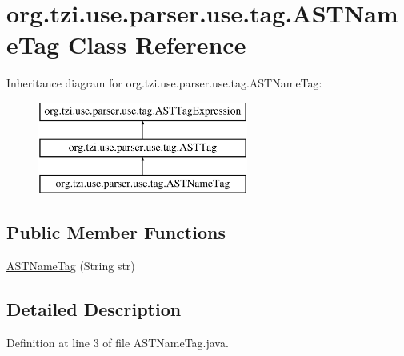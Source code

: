 \hypertarget{classorg_1_1tzi_1_1use_1_1parser_1_1use_1_1tag_1_1_a_s_t_name_tag}{\section{org.\-tzi.\-use.\-parser.\-use.\-tag.\-A\-S\-T\-Name\-Tag Class Reference}
\label{classorg_1_1tzi_1_1use_1_1parser_1_1use_1_1tag_1_1_a_s_t_name_tag}
}
Inheritance diagram for org.\-tzi.\-use.\-parser.\-use.\-tag.\-A\-S\-T\-Name\-Tag\-:\begin{figure}[H]
\begin{center}
\leavevmode
\includegraphics[height=3.000000cm]{classorg_1_1tzi_1_1use_1_1parser_1_1use_1_1tag_1_1_a_s_t_name_tag}
\end{center}
\end{figure}
\subsection*{Public Member Functions}
\begin{DoxyCompactItemize}
\item 
\hyperlink{classorg_1_1tzi_1_1use_1_1parser_1_1use_1_1tag_1_1_a_s_t_name_tag_a696eb0b8f93812794387cb91fdb15544}{A\-S\-T\-Name\-Tag} (String str)
\end{DoxyCompactItemize}


\subsection{Detailed Description}


Definition at line 3 of file A\-S\-T\-Name\-Tag.\-java.



